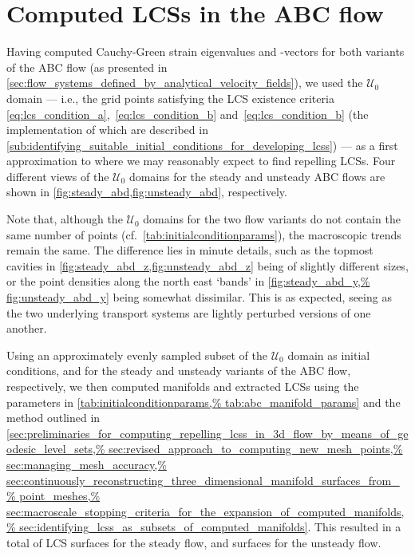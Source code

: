 \section{Computed LCSs in the ABC flow}
\label{sec:computed_lcss_in_the_abc_flow}

Having computed Cauchy-Green strain eigenvalues and -vectors for both
variants of the ABC flow (as presented in
\cref{sec:flow_systems_defined_by_analytical_velocity_fields}), we used
the $\mathcal{U}_{0}$ domain --- i.e., the grid points satisfying the LCS
existence criteria~ \eqref{eq:lcs_condition_a},~\eqref{eq:lcs_condition_b}
and~\eqref{eq:lcs_condition_b} (the implementation of which are
described in
\cref{sub:identifying_suitable_initial_conditions_for_developing_lcss}) --- as a
first approximation to where we may reasonably expect to find repelling LCSs.
Four different views of the $\mathcal{U}_{0}$ domains for the steady
and unsteady ABC flows are shown in \cref{fig:steady_abd,fig:unsteady_abd},
respectively.





Note that, although the $\mathcal{U}_{0}$ domains for the two
flow variants do not contain the same number of points (cf.\
\cref{tab:initialconditionparams}), the macroscopic trends remain the same. The
difference lies in minute details, such as the topmost cavities in
\cref{fig:steady_abd_z,fig:unsteady_abd_z} being of slightly different sizes,
or the point densities along the north east `bands' in \cref{fig:steady_abd_y,%
fig:unsteady_abd_y} being somewhat dissimilar. This is as expected, seeing
as the two underlying transport systems are lightly perturbed versions of
one another.

Using an approximately evenly sampled subset of the $\mathcal{U}_{0}$ domain
as initial conditions, \numprint{618} and \numprint{676} for the steady
and unsteady variants of the ABC flow, respectively, we then computed manifolds
and extracted LCSs using the parameters in \cref{tab:initialconditionparams,%
tab:abc_manifold_params} and the method
outlined in \cref{sec:preliminaries_for_computing_repelling_lcss_in_3d_flow_by_means_of_geodesic_level_sets,%
    sec:revised_approach_to_computing_new_mesh_points,%
    sec:managing_mesh_accuracy,%
    sec:continuously_reconstructing_three_dimensional_manifold_surfaces_from_%
    point_meshes,%
    sec:macroscale_stopping_criteria_for_the_expansion_of_computed_manifolds,%
    sec:identifying_lcss_as_subsets_of_computed_manifolds}. This resulted
in a total of \numprint{22} LCS surfaces for the steady flow, and
\numprint{31} surfaces for the unsteady flow.

